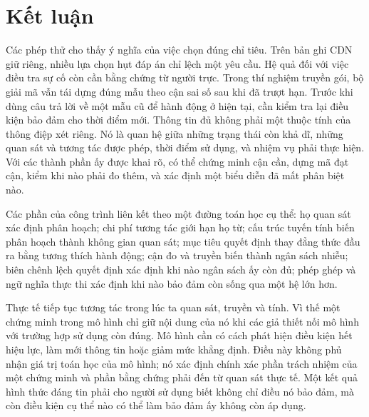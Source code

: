\section{Kết luận}
Các phép thử cho thấy ý nghĩa của việc chọn đúng chỉ tiêu. Trên bản ghi CDN giữ riêng, nhiều lựa chọn hụt đáp án chỉ lệch một yêu cầu. Hệ quả đối với việc điều tra sự cố còn cần bằng chứng từ người trực. Trong thí nghiệm truyền gói, bộ giải mã vẫn tái dựng đúng mẫu theo cận sai số sau khi đã trượt hạn. Trước khi dùng câu trả lời về một mẫu cũ để hành động ở hiện tại, cần kiểm tra lại điều kiện bảo đảm cho thời điểm mới.
Thông tin đủ không phải một thuộc tính của thông điệp xét riêng. Nó là quan hệ giữa những trạng thái còn khả dĩ, những quan sát và tương tác được phép, thời điểm sử dụng, và nhiệm vụ phải thực hiện. Với các thành phần ấy được khai rõ, có thể chứng minh cận cần, dựng mã đạt cận, kiểm khi nào phải đo thêm, và xác định một biểu diễn đã mất phân biệt nào.

Các phần của công trình liên kết theo một đường toán học cụ thể: họ quan sát xác định phân hoạch; chi phí tương tác giới hạn họ từ; cấu trúc tuyến tính biến phân hoạch thành không gian quan sát; mục tiêu quyết định thay đẳng thức đầu ra bằng tương thích hành động; cận đo và truyền biến thành ngân sách nhiễu; biên chênh lệch quyết định xác định khi nào ngân sách ấy còn đủ; phép ghép và ngữ nghĩa thực thi xác định khi nào bảo đảm còn sống qua một hệ lớn hơn.

Thực tế tiếp tục tương tác trong lúc ta quan sát, truyền và tính. Vì thế một chứng minh trong mô hình chỉ giữ nội dung của nó khi các giả thiết nối mô hình với trường hợp sử dụng còn đúng. Mô hình cần có cách phát hiện điều kiện hết hiệu lực, làm mới thông tin hoặc giảm mức khẳng định. Điều này không phủ nhận giá trị toán học của mô hình; nó xác định chính xác phần trách nhiệm của một chứng minh và phần bằng chứng phải đến từ quan sát thực tế. Một kết quả hình thức đáng tin phải cho người sử dụng biết không chỉ điều nó bảo đảm, mà còn điều kiện cụ thể nào có thể làm bảo đảm ấy không còn áp dụng.

